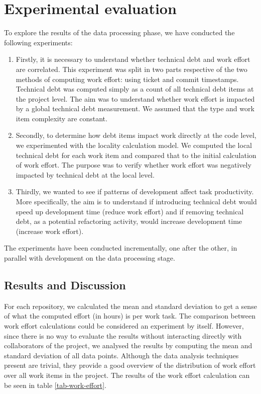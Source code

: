 \documentclass{mpaper}
\begin{document}
\section{Experimental evaluation}
\label{evaluation}

To explore the results of the data processing phase, we have conducted the
following experiments:

\begin{enumerate}
  
  \item Firstly, it is necessary to understand whether technical debt and work
  effort are correlated. This experiment was split in two parts respective of
  the two methods of computing work effort: using ticket and commit timestamps.
  Technical debt was computed simply as a count of all technical debt items at
  the project level. The aim was to understand whether work effort is impacted
  by a global technical debt measurement. We assumed that the type and work item
  complexity are constant.

  \item Secondly, to determine how debt items impact work directly at the code
  level, we experimented with the locality calculation model. We computed the
  local technical debt for each work item and compared that to the initial
  calculation of work effort. The purpose was to verify whether work effort was
  negatively impacted by technical debt at the local level. 
  
  \item Thirdly, we wanted to see if patterns of development affect task
  productivity. More specifically, the aim is to understand if introducing
  technical debt would speed up development time (reduce work effort) and if
  removing technical debt, as a potential refactoring activity, would increase
  development time (increase work effort).
\end{enumerate}

The experiments have been conducted incrementally, one after the other, in
parallel with development on the data processing stage.  

\subsection{Results and Discussion}
\label{results-discussion}

For each repository, we calculated the mean and standard deviation to get a
sense of what the computed effort (in hours) is per work task. The comparison
between work effort calculations could be considered an experiment by itself.
However, since there is no way to evaluate the results without interacting
directly with collaborators of the project, we analysed the results by computing
the mean and standard deviation of all data points. Although the data analysis
techniques present are trivial, they provide a good overview of the distribution
of work effort over all work items in the project. The results of the work
effort calculation can be seen in table \ref{tab-work-effort}.  
\end{document}
